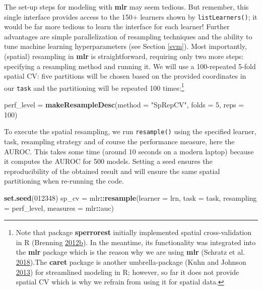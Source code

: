 \documentclass[]{krantz}
\newenvironment{Shaded}{\begin{snugshade}}{\end{snugshade}}
\newcommand{\DataTypeTok}[1]{\textcolor[rgb]{0.27,0.27,0.27}{#1}}
\newcommand{\DecValTok}[1]{\textcolor[rgb]{0.06,0.06,0.06}{#1}}
\newcommand{\KeywordTok}[1]{\textcolor[rgb]{0.27,0.27,0.27}{\textbf{#1}}}
\newcommand{\NormalTok}[1]{#1}
\newcommand{\OperatorTok}[1]{\textcolor[rgb]{0.43,0.43,0.43}{\textbf{#1}}}
\newcommand{\StringTok}[1]{\textcolor[rgb]{0.5,0.5,0.5}{#1}}
\let\rmarkdownfootnote\footnote%
\def\footnote{\protect\rmarkdownfootnote}
\begin{document}
The set-up steps for modeling with \textbf{mlr} may seem tedious.
But remember, this single interface provides access to the 150+ learners shown by \texttt{listLearners()}; it would be far more tedious to learn the interface for each learner!
Further advantages are simple parallelization of resampling techniques and the ability to tune machine learning hyperparameters (see Section \ref{svm}).
Most importantly, (spatial) resampling in \textbf{mlr} is straightforward, requiring only two more steps: specifying a resampling method and running it.
We will use a 100-repeated 5-fold spatial CV: five partitions will be chosen based on the provided coordinates in our \texttt{task} and the partitioning will be repeated 100 times:\footnote{Note that package \textbf{sperrorest} initially implemented spatial cross-validation in R (Brenning \protect\hyperlink{ref-brenning_spatial_2012}{2012}\protect\hyperlink{ref-brenning_spatial_2012}{b}).
  In the meantime, its functionality was integrated into the \textbf{mlr} package which is the reason why we are using \textbf{mlr} (Schratz et al. \protect\hyperlink{ref-schratz_performance_nodate}{2018}).The \textbf{caret} package is another umbrella-package (Kuhn and Johnson \protect\hyperlink{ref-kuhn_applied_2013}{2013}) for streamlined modeling in R; however, so far it does not provide spatial CV which is why we refrain from using it for spatial data.}

\begin{Shaded}
\begin{Highlighting}[]
\NormalTok{perf_level =}\StringTok{ }\KeywordTok{makeResampleDesc}\NormalTok{(}\DataTypeTok{method =} \StringTok{"SpRepCV"}\NormalTok{, }\DataTypeTok{folds =} \DecValTok{5}\NormalTok{, }\DataTypeTok{reps =} \DecValTok{100}\NormalTok{)}
\end{Highlighting}
\end{Shaded}

To execute the spatial resampling, we run \texttt{resample()} using the specified learner, task, resampling strategy and of course the performance measure, here the AUROC.
This takes some time (around 10 seconds on a modern laptop) because it computes the AUROC for 500 models.
Setting a seed ensures the reproducibility of the obtained result and will ensure the same spatial partitioning when re-running the code.

\begin{Shaded}
\begin{Highlighting}[]
\KeywordTok{set.seed}\NormalTok{(}\DecValTok{012348}\NormalTok{)}
\NormalTok{sp_cv =}\StringTok{ }\NormalTok{mlr}\OperatorTok{::}\KeywordTok{resample}\NormalTok{(}\DataTypeTok{learner =}\NormalTok{ lrn, }\DataTypeTok{task =}\NormalTok{ task,}
                      \DataTypeTok{resampling =}\NormalTok{ perf_level, }
                      \DataTypeTok{measures =}\NormalTok{ mlr}\OperatorTok{::}\NormalTok{auc)}
\end{Highlighting}
\end{Shaded}
\end{document}
